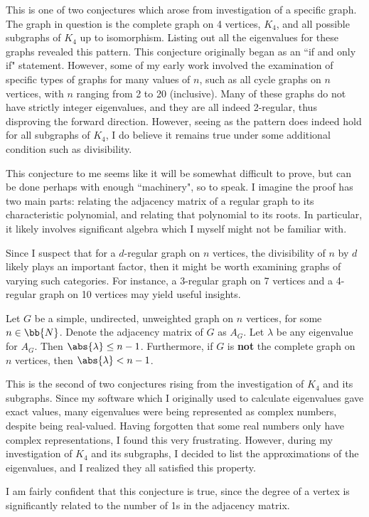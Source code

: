\documentclass{article}
\begin{document}
This is one of two conjectures which arose from investigation of a specific graph.
The graph in question is the complete graph on 4 vertices, $ K_{4} $, and all possible subgraphs of $ K_{4} $ up to isomorphism.
Listing out all the eigenvalues for these graphs revealed this pattern. \vsp
This conjecture originally began as an ``if and only if" statement.
However, some of my early work involved the examination of specific types of graphs for many values of $ n $, such as all cycle graphs on $ n $ vertices, with $ n $ ranging from 2 to 20 (inclusive).
Many of these graphs do not have strictly integer eigenvalues, and they are all indeed 2-regular, thus disproving the forward direction.
However, seeing as the pattern does indeed hold for all subgraphs of $ K_{4} $, I do believe it remains true under some additional condition such as divisibility. \npgh

This conjecture to me seems like it will be somewhat difficult to prove, but can be done perhaps with enough ``machinery", so to speak.
I imagine the proof has two main parts: relating the adjacency matrix of a regular graph to its characteristic polynomial, and relating that polynomial to its roots.
In particular, it likely involves significant algebra which I myself might not be familiar with. \npgh

Since I suspect that for a $ d $-regular graph on $ n $ vertices, the divisibility of $ n $ by $ d $ likely plays an important factor, then it might be worth examining graphs of varying such categories.
For instance, a 3-regular graph on 7 vertices and a 4-regular graph on 10 vertices may yield useful insights.

\newpage
\begin{mylm}[type=Conjecture 3]
Let $ G $ be a simple, undirected, unweighted graph on $ n $ vertices, for some $ n \in \bb{N} $. Denote the adjacency matrix of $ G $ as $ A_{G} $. \vsp
Let $ \lambda $ be any eigenvalue for $ A_{G} $. Then $ \abs{\lambda} \leq n - 1 $. 
Furthermore, if $ G $ is \textbf{not} the complete graph on $ n $ vertices, then $ \abs{\lambda} < n - 1 $.
\end{mylm}

This is the second of two conjectures rising from the investigation of $ K_{4} $ and its subgraphs.
Since my software which I originally used to calculate eigenvalues gave exact values, many eigenvalues were being represented as complex numbers, despite being real-valued.
Having forgotten that some real numbers only have complex representations, I found this very frustrating.
However, during my investigation of $ K_{4} $ and its subgraphs, I decided to list the approximations of the eigenvalues, and I realized they all satisfied this property. \npgh

I am fairly confident that this conjecture is true, since the degree of a vertex is significantly related to the number of 1s in the adjacency matrix. \npgh
\end{document}
